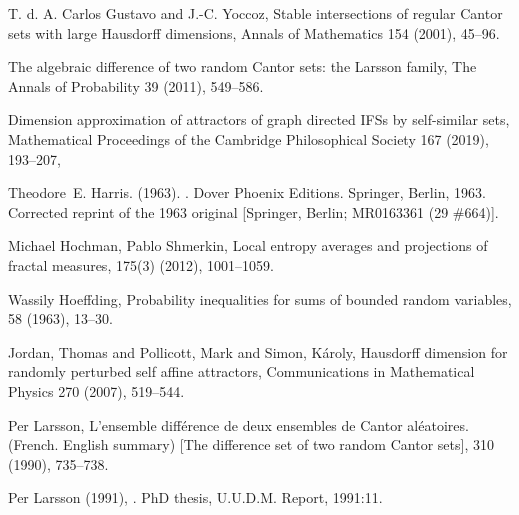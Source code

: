 \documentclass[amssymb,amsfonts,12pt,verbatim,righttag,oneside]{amsart}
\numberwithin{equation}{section} %
\theoremstyle{plain}
\theoremstyle{plain}
\begin{document}
\begin{thebibliography}{13}

 T. d. A. Carlos Gustavo and J.-C. Yoccoz, Stable intersections of regular Cantor sets with
large Hausdorff dimensions, Annals of Mathematics 154 (2001), 45--96.

  {The algebraic difference of two random {C}antor sets: the {L}arsson family},
    {The Annals of Probability}  {39}  (2011), 549--586.

  {Dimension approximation of attractors of graph directed {IFS}s by self-similar sets},
  {Mathematical Proceedings of the Cambridge Philosophical Society} {167} (2019),  {193--207},

  {Theodore~E. Harris.} (1963).
  .
  \newblock Dover Phoenix Editions. Springer, Berlin, 1963.
  \newblock Corrected reprint of the 1963 original [Springer, Berlin; MR0163361   (29 \#664)].

 {Michael Hochman, Pablo Shmerkin,}
 \newblock Local entropy averages and projections of fractal measures,	
  175(3)  (2012), 1001--1059.


{Wassily Hoeffding,}
\newblock Probability inequalities for sums of bounded random variables,
 58 (1963), 13--30.

 Jordan, Thomas and Pollicott, Mark and Simon, K{\'a}roly,
  {Hausdorff dimension for randomly perturbed self affine attractors},
  {Communications in Mathematical Physics} {270} (2007), {519--544}.

 {Per Larsson,}
 \newblock L'ensemble diff{\'e}rence de deux ensembles de {C}antor
   al{\'e}atoires. ({F}rench. {E}nglish summary) [{T}he difference set of two  random {C}antor sets],
  310 (1990), 735--738.

  {Per Larsson} (1991),
  .
  \newblock PhD thesis, U.U.D.M. Report, 1991:11.


\end{thebibliography}
\end{document}
